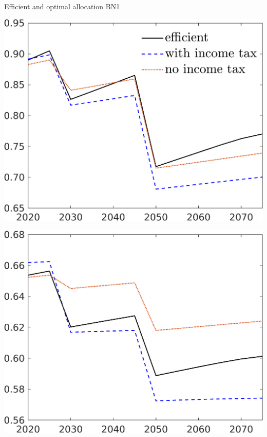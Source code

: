 \documentclass[11pt,aspectratio=169]{beamer}
\begin{document}
\begin{frame}{Efficient and optimal allocation BN1}
	\centering
	\begin{minipage}[]{0.32\textwidth}
		\includegraphics[width=1\textwidth]{../codding_model/own_basedOnFried/optimalPol_elastS_DisuSci/figures/all_1705/C_CompEffOPT_T_NoTaus_spillover0_sep1_BN1_ineq0_red0_etaa0.79_lgd1.png}
	\end{minipage}
	\begin{minipage}[]{0.32\textwidth}
		\includegraphics[width=1\textwidth]{../codding_model/own_basedOnFried/optimalPol_elastS_DisuSci/figures/all_1705/hh_CompEffOPT_T_NoTaus_spillover0_sep1_BN1_ineq0_red0_etaa0.79_lgd0.png}

\end{minipage}
\end{frame}
\end{document}
